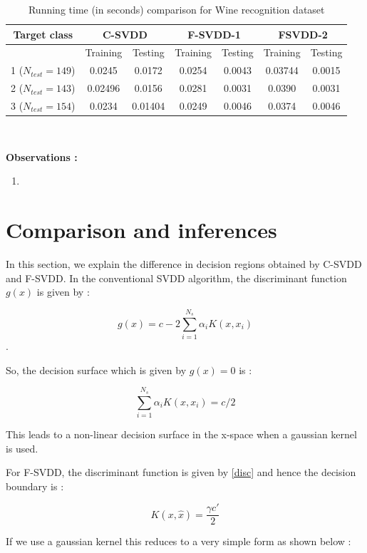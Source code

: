 \documentclass{article} %
\begin{document}
\begin{table}[H]
\begin{center}
\caption{Running time (in seconds) comparison for Wine recognition dataset}
\begin{tabular}{|c|c|c|c|c|c|c|}
\hline
Target class & \multicolumn{2}{|c|}{C-SVDD} & \multicolumn{2}{|c|}{F-SVDD-1} & \multicolumn{2}{|c|}{FSVDD-2}  \\ \hline
& Training & Testing & Training & Testing & Training & Testing \\ \hline
1 ($N_{test} =149$)  & 0.0245 & 0.0172 & 0.0254  & 0.0043  & 0.03744 & 0.0015 \\ \hline
2 ($N_{test} =143$) & 0.02496 & 0.0156 & 0.0281  &  0.0031 & 0.0390 & 0.0031 \\ \hline
3 ($N_{test} =154$) &  0.0234 & 0.01404 & 0.0249  & 0.0046 & 0.0374 & 0.0046 \\ \hline

\end{tabular} \\[5pt]
\end{center}
\end{table}


\textbf{Observations :}
\begin{enumerate}
\item 
\end{enumerate}

\section{Comparison and inferences}
In this section, we explain the difference in decision regions obtained by C-SVDD and F-SVDD. In the conventional SVDD algorithm, the discriminant function $g(x)$ is given by :

\[ g(x) = c - 2 \sum\limits_{i=1}^{N_s}\alpha_i K(x,x_i) \].

So, the decision surface which is given by $g(x) = 0$ is   :

\[  \sum\limits_{i=1}^{N_s}\alpha_i K(x,x_i)  = c/2 \]

This leads to a non-linear decision surface in the x-space when a gaussian kernel is used.

For F-SVDD, the discriminant function is given by \ref{disc} and hence the decision boundary is :

\[ K(x,\hat{x}) = \frac{\gamma c'}{2}\]

If we use a gaussian kernel this reduces to a very simple form as shown below :
\end{document}
